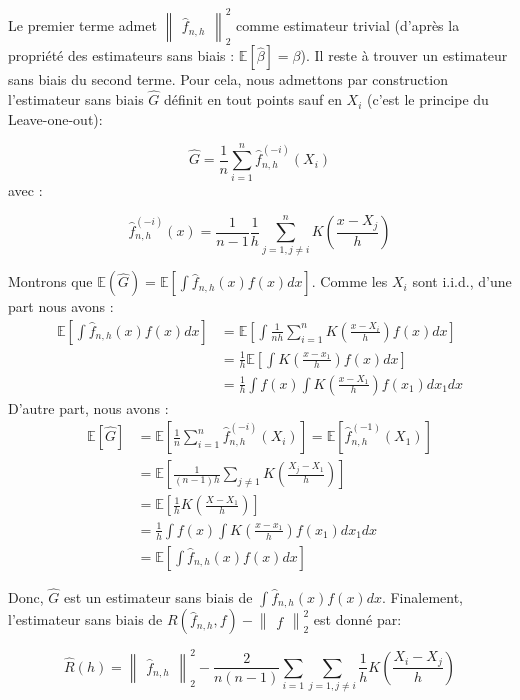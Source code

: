 \documentclass[
]{book}
\begin{document}
Le premier terme admet \(\begin{Vmatrix}\hat {f}_{n,h}\end{Vmatrix}_2^2\) comme estimateur trivial (d'après la propriété des estimateurs sans biais : \(\mathbb{E}[\hat {\beta}]=\beta\)).\newline
Il reste à trouver un estimateur sans biais du second terme. Pour cela, nous admettons par construction l'estimateur sans biais \(\hat {G}\) définit en tout points sauf en \(X_i\) (c'est le principe du Leave-one-out):

\[
\hat{G} = \frac{1}{n}\sum_{i=1}^n\hat {f}_{n,h}^{(-i)}(X_i)
\]
avec :

\[
  \hat {f}_{n,h}^{(-i)}(x)= \frac{1}{n-1}\frac{1}{h}\sum_{j=1,j\ne i}^nK(\frac{x-X_j}{h})
\]

Montrons que \(\mathbb{E}(\hat{G})=\mathbb{E}[\int \hat{f}_{n,h}(x)f(x)dx]\).\newline
Comme les \(X_i\) sont i.i.d., d'une part nous avons :
\[
\begin{aligned}
\mathbb{E}[\int \hat {f}_{n,h}(x)f(x)dx]&= \mathbb{E}[\int \frac {1}{nh}\sum_{i=1}^nK(\frac {x-X_i}{h})f(x)dx]\\
&=\frac{1}{h}\mathbb{E}[\int K(\frac {x-x_1}{h})f(x)dx] \\
&=\frac{1}{h}\int f(x)\int K(\frac {x-X_1}{h})f(x_1)dx_1dx
\end{aligned}
\]
D'autre part, nous avons :
\[ 
\begin{aligned}
\mathbb{E}[\hat{G}]&=\mathbb{E}[\frac{1}{n}\sum_{i=1}^n\hat{f}_{n,h}^{(-i)}(X_i)]
=\mathbb{E}[\hat{f}_{n,h}^{(-1)}(X_1)]\\
&=\mathbb{E}[\frac{1}{(n-1)h}\sum_{j\ne 1}K(\frac{X_j-X_1}{h})]\\
&=\mathbb{E}[\frac{1}{h}K(\frac{X-X_1}{h})]\\
&=\frac{1}{h}\int f(x)\int K(\frac{x-x_1}{h})f(x_1)dx_1dx\\
&=\mathbb{E}[\int \hat{f}_{n,h}(x)f(x)dx] 
\end{aligned}
\]

Donc, \(\hat{G}\) est un estimateur sans biais de \(\int\hat{f}_{n,h}(x)f(x)dx\). Finalement, l'estimateur sans biais de \(R(\hat{f}_{n,h}, f)-\begin{Vmatrix}{f}\end{Vmatrix}_2^2\) est donné par:

\[
\hat{R}(h)=\begin{Vmatrix}\hat{f}_{n,h}\end{Vmatrix}_2^2-\frac{2}{n(n-1)}\sum_{i=1}\sum_{j=1,j\ne i}\frac{1}{h}K(\frac{X_i-X_j}{h})
\]
\end{document}
